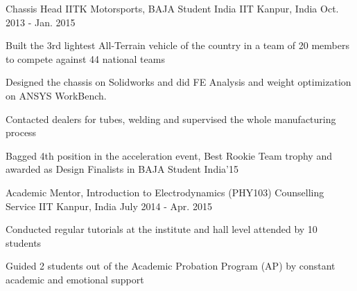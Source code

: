 

\begin{cventries}
	\cventry
	{Chassis Head} %
	{IITK Motorsports, BAJA Student India} %
	{IIT Kanpur, India} %
	{Oct. 2013 - Jan. 2015} %
	{
		\begin{cvitems} %
			\item {Built the 3rd lightest All-Terrain vehicle of the country in a team of 20 members to compete against 44 national teams}
			\item { Designed the chassis on Solidworks and did FE Analysis and weight optimization on ANSYS WorkBench.}
			\item {
				Contacted dealers for tubes, welding and supervised the whole manufacturing process
			}
			\item { Bagged 4th position in the acceleration event, Best Rookie Team trophy and awarded as Design Finalists in BAJA Student India’15 }
		\end{cvitems}
	}
  \cventry
    {Academic Mentor, Introduction to Electrodynamics (PHY103)} %
    {Counselling Service} %
    {IIT Kanpur, India} %
    {July 2014 - Apr. 2015} %
    {
      \begin{cvitems} %
		\item {Conducted regular tutorials at the institute and hall level attended by 10 students}
		\item {Guided 2 students out of the Academic Probation Program (AP) by constant academic and emotional support }
      \end{cvitems}
    }




\end{cventries}

